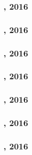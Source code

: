 \subsubsection{, 2016}
\paragraph{}

\subsubsection{, 2016}
\paragraph{}

\subsubsection{, 2016}
\paragraph{}

\subsubsection{, 2016}
\paragraph{}

\subsubsection{, 2016}
\paragraph{}

\subsubsection{, 2016}
\paragraph{}

\subsubsection{, 2016}
\paragraph{}

